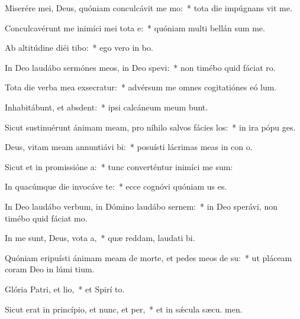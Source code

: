 \item Miserére mei, Deus, quóniam conculcávit me mo:~* tota die impúgnans vit me.
\item Conculcavérunt me inimíci mei tota e:~* quóniam multi bellán sum me.
\item Ab altitúdine diéi tibo:~* ego vero in  bo.
\item In Deo laudábo sermónes meos, in Deo spevi:~* non timébo quid fáciat  ro.
\item Tota die verba mea exsecratur:~* advérsum me omnes cogitatiónes eó  lum.
\item Inhabitábunt, et absdent:~* ipsi calcáneum meum bunt.
\item Sicut sustinuérunt ánimam meam, pro níhilo salvos fácies los:~* in ira pópu ges.
\item Deus, vitam meam annuntiávi bi:~* posuísti lácrimas meas in con o.
\item Sicut et in promissióne a:~* tunc converténtur inimíci me sum:
\item In quacúmque die invocáve te:~* ecce cognóvi quóniam  us es.
\item In Deo laudábo verbum, in Dómino laudábo sernem:~* in Deo sperávi, non timébo quid fáciat  mo.
\item In me sunt, Deus, vota a,~* quæ reddam, laudati bi.
\item Quóniam eripuísti ánimam meam de morte, et pedes meos de su:~* ut pláceam coram Deo in lúmi tium.
\item Glória Patri, et lio,~* et Spirí to.
\item Sicut erat in princípio, et nunc, et per,~* et in sǽcula sæcu. men.
